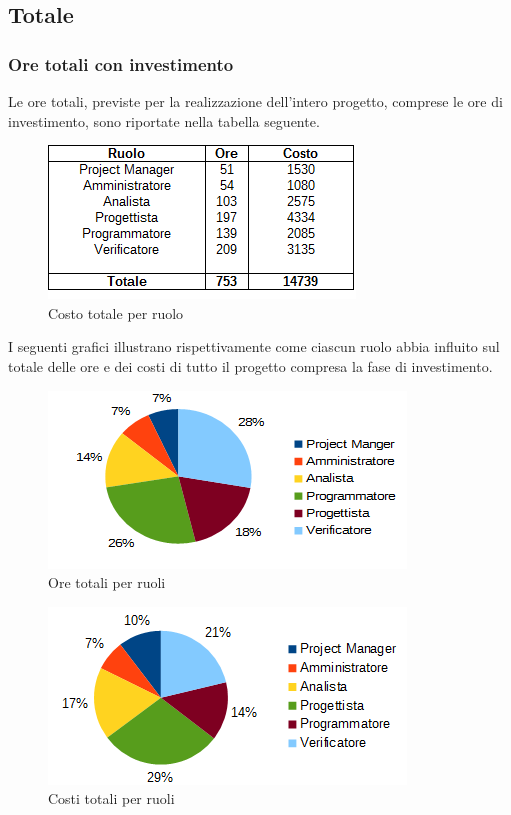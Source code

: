 	\subsection{Totale}
		\subsubsection{Ore totali con investimento}
		Le ore totali, previste per la realizzazione dell'intero progetto, comprese le ore di investimento, sono riportate nella tabella seguente. \\
		\begin{figure}[H]
			\centering
			\includegraphics[scale=0.75]{immagini/tabelle/riepilogo_conclusivo-costo.png}
			\caption{Costo totale per ruolo}
		\end{figure}
		I seguenti grafici illustrano rispettivamente come ciascun ruolo abbia influito sul totale delle ore e dei costi di tutto il progetto compresa la fase di investimento. \\
		\begin{figure}[H]
		\centering
			\includegraphics[scale=1]{immagini/grafici/riepilogo_conclusivo-torta.png}
			\caption{Ore totali per ruoli}
		\end{figure}
		\begin{figure}[H]
			\centering
			\includegraphics[scale=1]{immagini/grafici/riepilogo_conclusivo-torta-costo.png}
			\caption{Costi totali per ruoli}
		\end{figure}
